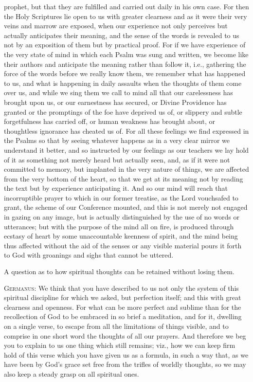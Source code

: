 prophet, but that they are fulfilled and carried out daily in his own case. For then the Holy Scriptures lie open to us with greater clearness and as it were their very veins and marrow are exposed, when our experience not only perceives but actually anticipates their meaning, and the sense of the words is revealed to us not by an exposition of them but by practical proof. For if we have experience of the very state of mind in which each Psalm was sung and written, we become like their authors and anticipate the meaning rather than follow it, i.e., gathering the force of the words before we really know them, we remember what has happened to us, and what is happening in daily assaults when the thoughts of them come over us, and while we sing them we call to mind all that our carelessness has brought upon us, or our earnestness has secured, or Divine Providence has granted or the promptings of the foe have deprived us of, or slippery and subtle forgetfulness has carried off, or human weakness has brought about, or thoughtless ignorance has cheated us of. For all these feelings we find expressed in the Psalms so that by seeing whatever happens as in a very clear mirror we understand it better, and so instructed by our feelings as our teachers we lay hold of it as something not merely heard but actually seen, and, as if it were not committed to memory, but implanted in the very nature of things, we are affected from the very bottom of the heart, so that we get at its meaning not by reading the text but by experience anticipating it. And so our mind will reach that incorruptible prayer to which in our former treatise, as the Lord vouchsafed to grant, the scheme of our Conference mounted, and this is not merely not engaged in gazing on any image, but is actually distinguished by the use of no words or utterances; but with the purpose of the mind all on fire, is produced through ecstasy of heart by some unaccountable keenness of spirit, and the mind being thus affected without the aid of the senses or any visible material pours it forth to God with groanings and sighs that cannot be uttered.


A question as to how spiritual thoughts can be retained without losing them.

\textsc{Germanus}: We think that you have described to us not only the system of this spiritual discipline for which we asked, but perfection itself; and this with great clearness and openness. For what can be more perfect and sublime than for the recollection of God to be embraced in so brief a meditation, and for it, dwelling on a single verse, to escape from all the limitations of things visible, and to comprise in one short word the thoughts of all our prayers. And therefore we beg you to explain to us one thing which still remains; viz., how we can keep firm hold of this verse which you have given us as a formula, in such a way that, as we have been by God’s grace set free from the trifles of worldly thoughts, so we may also keep a steady grasp on all spiritual ones.

